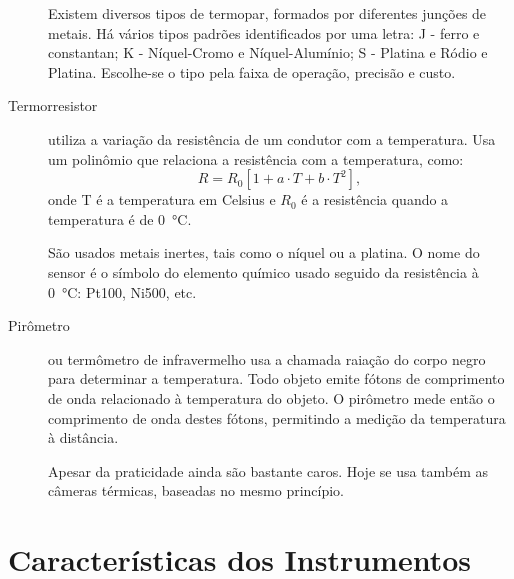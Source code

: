 \begin{description}
Existem diversos tipos de termopar, formados por diferentes junções de metais. Há vários tipos padrões identificados por uma letra: J - ferro e constantan; K - Níquel-Cromo e Níquel-Alumínio; S - Platina e Ródio e Platina. Escolhe-se o tipo pela faixa de operação, precisão e custo.

  \item[Termorresistor] utiliza a variação da resistência de um condutor com a temperatura. Usa um polinômio que relaciona a resistência com a temperatura, como:
  \[
R = R_0[1+a\cdot T+b\cdot T^2],
  \]
onde T é a temperatura em Celsius e $R_0$ é a resistência quando a temperatura é de \SI{0}{\celsius}.

São usados metais inertes, tais como o níquel ou a platina. O nome do sensor é o símbolo do elemento químico usado seguido da resistência à \SI{0}{\celsius}: Pt100, Ni500, etc.
  \item[Pirômetro] ou termômetro de infravermelho usa a chamada raiação do corpo negro para determinar a temperatura. Todo objeto emite fótons de comprimento de onda relacionado à temperatura do objeto. O pirômetro mede então o comprimento de onda destes fótons, permitindo a medição da temperatura à distância.

  Apesar da praticidade ainda são bastante caros. Hoje se usa também as câmeras térmicas, baseadas no mesmo princípio.
\end{description}

\section{Características dos Instrumentos}
\label{sec:Características dos Instrumentos}

